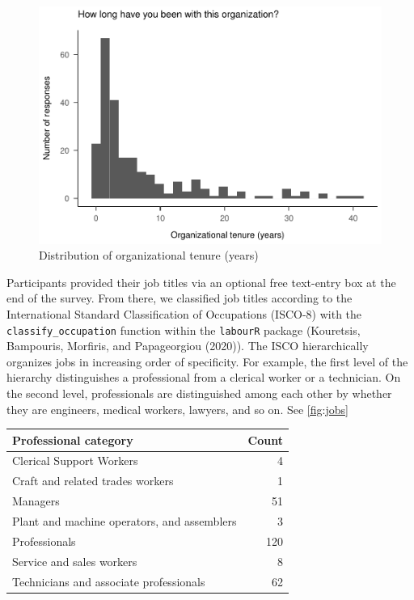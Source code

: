 \documentclass[
  english,
  man]{apa6}
\begin{document}
\begin{figure}
\centering
\includegraphics{SIOPpapaja_files/figure-latex/tenure-1.pdf}
\caption{\label{fig:tenure}Distribution of organizational tenure (years)}
\end{figure}

Participants provided their job titles via an optional free text-entry box at the end of the survey. From there, we classified job titles according to the International Standard Classification of Occupations (ISCO-8) with the \texttt{classify\_occupation} function within the \texttt{labourR} package (Kouretsis, Bampouris, Morfiris, and Papageorgiou (2020)). The ISCO hierarchically organizes jobs in increasing order of specificity. For example, the first level of the hierarchy distinguishes a professional from a clerical worker or a technician. On the second level, professionals are distinguished among each other by whether they are engineers, medical workers, lawyers, and so on. See \ref{fig:jobs}

\begin{tabular}{l|r}
\hline
Professional category & Count\\
\hline
Clerical Support Workers & 4\\
\hline
Craft and related trades workers & 1\\
\hline
Managers & 51\\
\hline
Plant and machine operators, and assemblers & 3\\
\hline
Professionals & 120\\
\hline
Service and sales workers & 8\\
\hline
Technicians and associate professionals & 62\\
\hline
\end{tabular}
\end{document}
